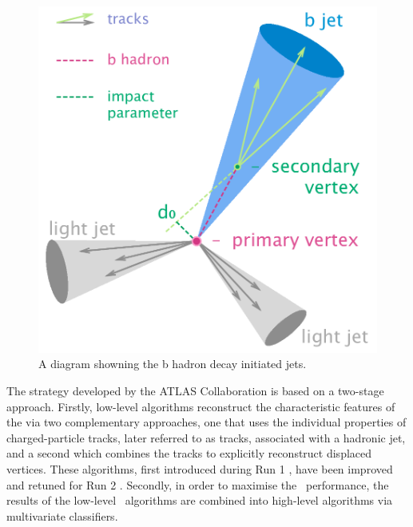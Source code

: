\documentclass[letterpaper,12pt]{article}
\begin{document}
\begin{figure}[]
	\begin{centering}	
	\includegraphics[width=.4\textwidth]{FTAG_plots/B-tagging_diagram.png}
	\caption{A diagram showning the b hadron decay initiated jets. }
	\label{fig:b-jet-decay}
	\end{centering}
\end{figure}


The strategy developed by the ATLAS Collaboration is based on a two-stage approach. 
Firstly, low-level algorithms reconstruct the characteristic features of 
the \bjets via two complementary approaches, one that uses the 
individual properties of charged-particle tracks, later referred 
to as tracks, associated with a hadronic jet, and a second which 
combines the tracks to explicitly reconstruct displaced vertices. 
These algorithms, first introduced during Run 1 \cite{PERF-2012-04}, 
have been improved and retuned for Run 2 \cite{FTAG-2018-01}. 
Secondly, in order to 
maximise the \btagging\ performance, the results of the low-level 
\btagging\ algorithms are combined into high-level algorithms 
via multivariate classifiers. 
\end{document}
